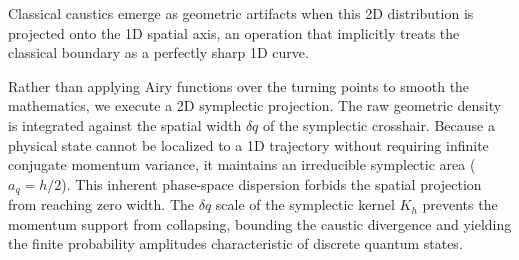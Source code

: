 \documentclass[%
  aps, reprint, prl, amsmath,amssymb
]{revtex4-2}
\begin{document}
Classical caustics emerge as geometric artifacts when this 2D distribution is projected onto the 1D spatial axis, an operation that implicitly treats the classical boundary as a perfectly sharp 1D curve.

Rather than applying Airy functions over the turning points to smooth the mathematics, we execute a 2D symplectic projection. The raw geometric density is integrated against the spatial width $\delta q$ of the symplectic crosshair. Because a physical state cannot be localized to a 1D trajectory without requiring infinite conjugate momentum variance, it maintains an irreducible symplectic area ($a_q = h/2$). This inherent phase-space dispersion forbids the spatial projection from reaching zero width. The $\delta q$ scale of the symplectic kernel $K_h$ prevents the momentum support from collapsing, bounding the caustic divergence and yielding the finite probability amplitudes characteristic of discrete quantum states.


\end{document}
